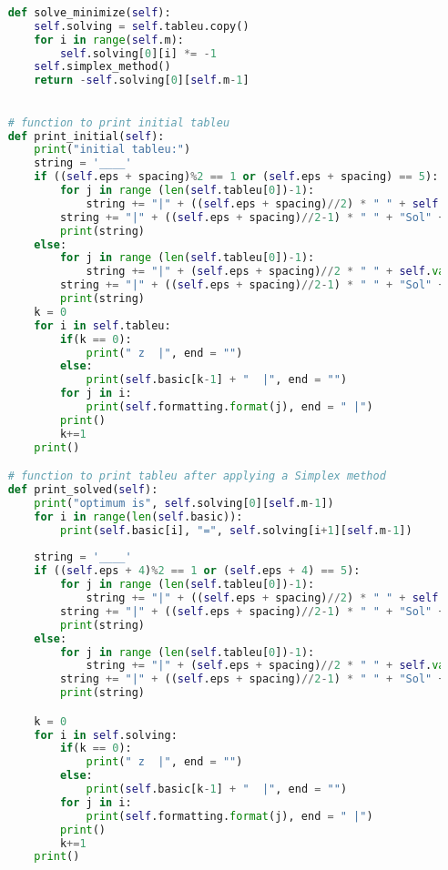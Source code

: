 \documentclass[12pt, legalpaper]{exam}
\begin{document}
\begin{lstlisting}[language=Python, caption=Программа на Python, label=lst:python-code]
    
    def solve_minimize(self): 
        self.solving = self.tableu.copy()
        for i in range(self.m):
            self.solving[0][i] *= -1
        self.simplex_method()
        return -self.solving[0][self.m-1]

    
    # function to print initial tableu
    def print_initial(self):
        print("initial tableu:")
        string = '____'
        if ((self.eps + spacing)%2 == 1 or (self.eps + spacing) == 5):
            for j in range (len(self.tableu[0])-1):
                string += "|" + ((self.eps + spacing)//2) * " " + self.vars[j] + ((self.eps + spacing)//2) * " "
            string += "|" + ((self.eps + spacing)//2-1) * " " + "Sol" + (self.eps + spacing)//2 * " " + "|"
            print(string)
        else: 
            for j in range (len(self.tableu[0])-1):
                string += "|" + (self.eps + spacing)//2 * " " + self.vars[j] + ((self.eps + spacing)//2-1) * " "
            string += "|" + ((self.eps + spacing)//2-1) * " " + "Sol" + ((self.eps + spacing)//2-1) * " " + "|"
            print(string)
        k = 0
        for i in self.tableu:
            if(k == 0):
                print(" z  |", end = "")
            else:
                print(self.basic[k-1] + "  |", end = "")
            for j in i:
                print(self.formatting.format(j), end = " |")
            print()
            k+=1
        print()

    # function to print tableu after applying a Simplex method
    def print_solved(self):
        print("optimum is", self.solving[0][self.m-1])
        for i in range(len(self.basic)):
            print(self.basic[i], "=", self.solving[i+1][self.m-1])
            
        string = '____'
        if ((self.eps + 4)%2 == 1 or (self.eps + 4) == 5):
            for j in range (len(self.tableu[0])-1):
                string += "|" + ((self.eps + spacing)//2) * " " + self.vars[j] + ((self.eps + spacing)//2) * " "
            string += "|" + ((self.eps + spacing)//2-1) * " " + "Sol" + (self.eps + spacing)//2 * " " + "|"
            print(string)
        else: 
            for j in range (len(self.tableu[0])-1):
                string += "|" + (self.eps + spacing)//2 * " " + self.vars[j] + ((self.eps + spacing)//2-1) * " "
            string += "|" + ((self.eps + spacing)//2-1) * " " + "Sol" + ((self.eps + spacing)//2-1) * " " + "|"
            print(string)

        k = 0
        for i in self.solving:
            if(k == 0):
                print(" z  |", end = "")
            else:
                print(self.basic[k-1] + "  |", end = "")
            for j in i:
                print(self.formatting.format(j), end = " |")
            print()
            k+=1
        print()



\end{lstlisting}
\end{document}
